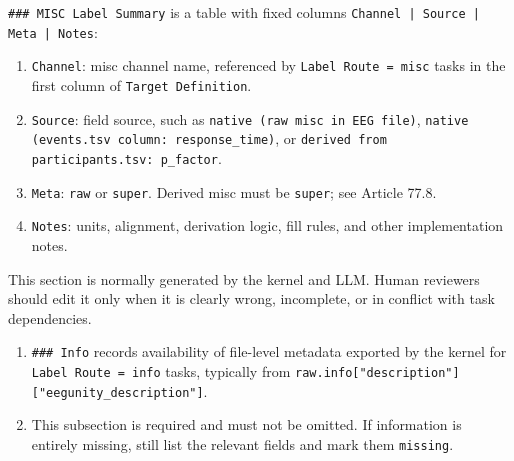 \begin{tcolorbox}
\smallskip{}\par\smallskip

\noindent \texttt{\#\#\# MISC Label Summary} is a table with fixed columns \texttt{Channel | Source | Meta | Notes}:\par\smallskip

\begin{enumerate}[leftmargin=1.5em,noitemsep,topsep=2pt]
\item \texttt{Channel}: misc channel name, referenced by \texttt{Label Route = misc} tasks in the first column of \texttt{Target Definition}.
\item \texttt{Source}: field source, such as \texttt{native (raw misc in EEG file)}, \texttt{native (events.tsv column: response\_time)}, or \texttt{derived from participants.tsv: p\_factor}.
\item \texttt{Meta}: \texttt{raw} or \texttt{super}. Derived misc must be \texttt{super}; see Article 77.8.
\item \texttt{Notes}: units, alignment, derivation logic, fill rules, and other implementation notes.
\end{enumerate}

\smallskip{}\par\smallskip

\noindent This section is normally generated by the kernel and LLM. Human reviewers should edit it only when it is clearly wrong, incomplete, or in conflict with task dependencies.\par\smallskip

\smallskip{}\par\smallskip

\begin{enumerate}[leftmargin=1.5em,noitemsep,topsep=2pt]
\item \texttt{\#\#\# Info} records availability of file-level metadata exported by the kernel for \texttt{Label Route = info} tasks, typically from \texttt{raw.info["description"]["eegunity\_description"]}.
\item This subsection is required and must not be omitted. If information is entirely missing, still list the relevant fields and mark them \texttt{missing}.
\end{enumerate}

\smallskip{}\par\smallskip


\end{tcolorbox}
